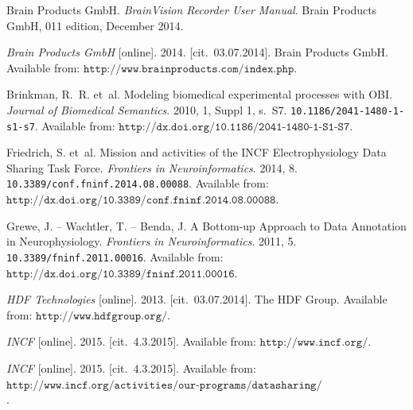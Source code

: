 \documentclass[conference]{IEEEtran}
\begin{document}
\begin{thebibliography}{1}
Brain Products GmbH.
\newblock \emph{BrainVision Recorder User Manual}.
\newblock Brain Products GmbH, 011 edition, December 2014.

\emph{Brain Products GmbH} [online]. 2014. [cit.~03.07.2014].
Brain Products GmbH.
\newblock Available from: $\texttt{{http://www.brainproducts.com/index.php}}$.



{\sc Brinkman}, R.~R. et~al.
\newblock Modeling biomedical experimental processes with {OBI}.
\newblock \emph{Journal of Biomedical Semantics}. 2010, 1, Suppl 1, s.~S7.
\newblock \texttt{10.1186/2041-1480-1-s1-s7}.
\newblock Available from:
$\texttt{{http://dx.doi.org/10.1186/2041-1480-1-S1-S7}}$.



{\sc Friedrich}, S. et~al.
\newblock Mission and activities of the {INCF} Electrophysiology Data Sharing
Task Force.
\newblock \emph{Frontiers in Neuroinformatics}. 2014, 8.
\newblock \texttt{10.3389/conf.fninf.2014.08.00088}.
\newblock Available from:
$\texttt{{http://dx.doi.org/10.3389/conf.fninf.2014.08.00088}}$.



{\sc Grewe}, J. -- {\sc Wachtler}, T. -- {\sc Benda}, J.
\newblock A Bottom-up Approach to Data Annotation in Neurophysiology.
\newblock \emph{Frontiers in Neuroinformatics}. 2011, 5.
\newblock \texttt{10.3389/fninf.2011.00016}.
\newblock Available from:
$\texttt{{http://dx.doi.org/10.3389/fninf.2011.00016}}$.

\emph{HDF Technologies} [online]. 2013. [cit.~03.07.2014]. The HDF Group.
\newblock Available from: $\texttt{{http://www.hdfgroup.org/}}$.

\emph{INCF} [online]. 2015. [cit.~4.3.2015].
\newblock Available from: $\texttt{{http://www.incf.org/}}$.

\emph{INCF} [online]. 2015. [cit.~4.3.2015].
\newblock Available from: $\texttt{{http://www.incf.org/activities/our-programs/datasharing/electrophysiology-task-force/}}$.





\end{thebibliography}
\end{document}
